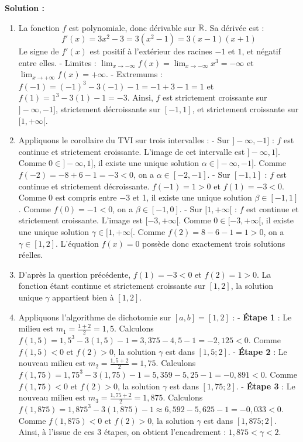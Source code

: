 \textbf{Solution :}
\begin{enumerate}
    \item La fonction $f$ est polynomiale, donc dérivable sur $\mathbb{R}$. Sa dérivée est :
    \[
    f'(x) = 3x^2 - 3 = 3(x^2 - 1) = 3(x-1)(x+1)
    \]
    Le signe de $f'(x)$ est positif à l'extérieur des racines $-1$ et $1$, et négatif entre elles.
    - Limites : $\lim_{x \to -\infty} f(x) = \lim_{x \to -\infty} x^3 = -\infty$ et $\lim_{x \to +\infty} f(x) = +\infty$.
    - Extremums : $f(-1) = (-1)^3 - 3(-1) - 1 = -1 + 3 - 1 = 1$ et $f(1) = 1^3 - 3(1) - 1 = -3$.
    Ainsi, $f$ est strictement croissante sur $]-\infty, -1]$, strictement décroissante sur $[-1, 1]$, et strictement croissante sur $[1, +\infty[$.
    
    \item Appliquons le corollaire du TVI sur trois intervalles :
    - Sur $]-\infty, -1]$ : $f$ est continue et strictement croissante. L'image de cet intervalle est $]-\infty, 1]$. Comme $0 \in ]-\infty, 1]$, il existe une unique solution $\alpha \in ]-\infty, -1]$. Comme $f(-2) = -8+6-1 = -3 < 0$, on a $\alpha \in [-2, -1]$.
    - Sur $[-1, 1]$ : $f$ est continue et strictement décroissante. $f(-1) = 1 > 0$ et $f(1) = -3 < 0$. Comme 0 est compris entre $-3$ et 1, il existe une unique solution $\beta \in [-1, 1]$. Comme $f(0) = -1 < 0$, on a $\beta \in [-1, 0]$.
    - Sur $[1, +\infty[$ : $f$ est continue et strictement croissante. L'image est $[-3, +\infty[$. Comme $0 \in [-3, +\infty[$, il existe une unique solution $\gamma \in [1, +\infty[$. Comme $f(2) = 8-6-1 = 1 > 0$, on a $\gamma \in [1, 2]$.
    L'équation $f(x)=0$ possède donc exactement trois solutions réelles.
    
    \item D'après la question précédente, $f(1) = -3 < 0$ et $f(2) = 1 > 0$. La fonction étant continue et strictement croissante sur $[1, 2]$, la solution unique $\gamma$ appartient bien à $[1, 2]$.
    
    \item Appliquons l'algorithme de dichotomie sur $[a, b] = [1, 2]$ :
    - \textbf{Étape 1} : Le milieu est $m_1 = \frac{1+2}{2} = 1,5$.
      Calculons $f(1,5) = 1,5^3 - 3(1,5) - 1 = 3,375 - 4,5 - 1 = -2,125 < 0$.
      Comme $f(1,5) < 0$ et $f(2) > 0$, la solution $\gamma$ est dans $[1,5; 2]$.
    - \textbf{Étape 2} : Le nouveau milieu est $m_2 = \frac{1,5+2}{2} = 1,75$.
      Calculons $f(1,75) = 1,75^3 - 3(1,75) - 1 = 5,359 - 5,25 - 1 = -0,891 < 0$.
      Comme $f(1,75) < 0$ et $f(2) > 0$, la solution $\gamma$ est dans $[1,75; 2]$.
    - \textbf{Étape 3} : Le nouveau milieu est $m_3 = \frac{1,75+2}{2} = 1,875$.
      Calculons $f(1,875) = 1,875^3 - 3(1,875) - 1 \approx 6,592 - 5,625 - 1 = -0,033 < 0$.
      Comme $f(1,875) < 0$ et $f(2) > 0$, la solution $\gamma$ est dans $[1,875; 2]$.
    Ainsi, à l'issue de ces 3 étapes, on obtient l'encadrement : $1,875 < \gamma < 2$.
\end{enumerate}

